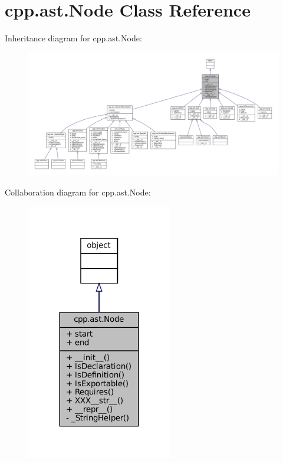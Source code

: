 \hypertarget{classcpp_1_1ast_1_1Node}{}\section{cpp.\+ast.\+Node Class Reference}
\label{classcpp_1_1ast_1_1Node}


Inheritance diagram for cpp.\+ast.\+Node\+:
\nopagebreak
\begin{figure}[H]
\begin{center}
\leavevmode
\includegraphics[width=350pt]{classcpp_1_1ast_1_1Node__inherit__graph}
\end{center}
\end{figure}


Collaboration diagram for cpp.\+ast.\+Node\+:
\nopagebreak
\begin{figure}[H]
\begin{center}
\leavevmode
\includegraphics[width=180pt]{classcpp_1_1ast_1_1Node__coll__graph}
\end{center}
\end{figure}
